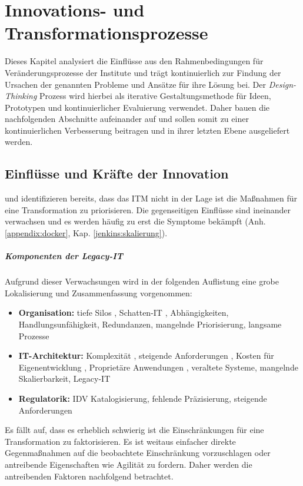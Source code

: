 \chapter{Innovations- und Transformationsprozesse}
Dieses Kapitel analysiert die Einflüsse aus den Rahmenbedingungen für Veränderungsprozesse der Institute und trägt kontinuierlich zur Findung der Ursachen der genannten Probleme und Ansätze für ihre Lösung bei. Der \emph{Design-Thinking} Prozess wird hierbei als iterative Gestaltungsmethode für Ideen, Prototypen und kontinuierlicher Evaluierung verwendet. Daher bauen die nachfolgenden Abschnitte aufeinander auf und sollen somit zu einer kontinuierlichen Verbesserung beitragen und in ihrer letzten Ebene ausgeliefert werden.

\section{Einflüsse und Kräfte der Innovation}
\citet{Ganswindt2006} und \citet{Koch2016} identifizieren bereits, dass das \ac{ITM} nicht in der Lage ist die Maßnahmen für eine Transformation zu priorisieren.
Die gegenseitigen Einflüsse sind ineinander verwachsen und es werden häufig zu erst die Symptome bekämpft (Anh.\ref{appendix:docker}, Kap. \ref{jenkins:skalierung}).

\paragraph{Komponenten der Legacy-IT}
\label{einschr:assets}
Aufgrund dieser Verwachsungen wird in der folgenden Auflistung eine grobe Lokalisierung und Zusammenfassung vorgenommen:
\begin{itemize}
    \item \textbf{Organisation:} tiefe Silos \cite{Gupta:2017}, Schatten-IT \cite{recht/Bornemann2018}, Abhängigkeiten, Handlungsunfähigkeit, Redundanzen, mangelnde Priorisierung, langsame Prozesse
    \item \textbf{IT-Architektur:} Komplexität \cite{Brockhoff2006}, steigende Anforderungen \cite{Brockhoff2006}, Kosten für Eigenentwicklung \cite{Gupta:2017}, Proprietäre Anwendungen \cite{Bussmann2006}, veraltete Systeme, mangelnde Skalierbarkeit, Legacy-IT
    \item \textbf{Regulatorik:} \ac{IDV} Katalogisierung\cite{recht/Bornemann2018}, fehlende Präzisierung, steigende Anforderungen
\end{itemize}

Es fällt auf, dass es erheblich schwierig ist die Einschränkungen für eine Transformation zu faktorisieren. Es ist weitaus einfacher direkte Gegenmaßnahmen auf die beobachtete Einschränkung vorzuschlagen oder antreibende Eigenschaften wie Agilität zu fordern. Daher werden die antreibenden Faktoren nachfolgend betrachtet.

